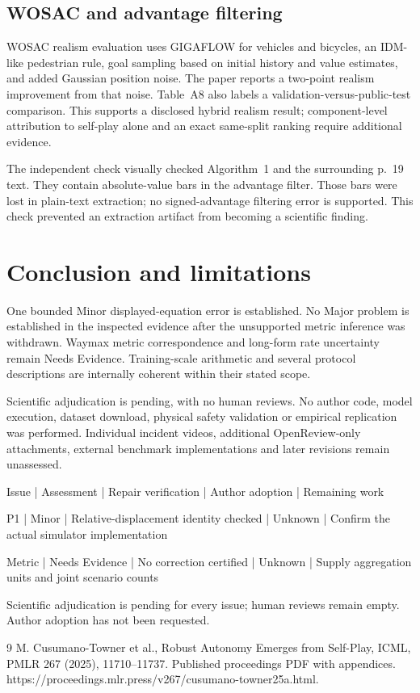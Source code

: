 \documentclass[10pt]{article}
\begin{document}
\subsection*{WOSAC and advantage filtering}
WOSAC realism evaluation uses GIGAFLOW for vehicles and bicycles, an IDM-like pedestrian rule, goal sampling based on initial history and value estimates, and added Gaussian position noise. The paper reports a two-point realism improvement from that noise. Table A8 also labels a validation-versus-public-test comparison. This supports a disclosed hybrid realism result; component-level attribution to self-play alone and an exact same-split ranking require additional evidence.\par
The independent check visually checked Algorithm 1 and the surrounding p. 19 text. They contain absolute-value bars in the advantage filter. Those bars were lost in plain-text extraction; no signed-advantage filtering error is supported. This check prevented an extraction artifact from becoming a scientific finding.\par
\section*{Conclusion and limitations}
One bounded Minor displayed-equation error is established. No Major problem is established in the inspected evidence after the unsupported metric inference was withdrawn. Waymax metric correspondence and long-form rate uncertainty remain Needs Evidence. Training-scale arithmetic and several protocol descriptions are internally coherent within their stated scope.\par
Scientific adjudication is pending, with no human reviews. No author code, model execution, dataset download, physical safety validation or empirical replication was performed. Individual incident videos, additional OpenReview-only attachments, external benchmark implementations and later revisions remain unassessed.\par
Issue | Assessment | Repair verification | Author adoption | Remaining work\par
P1 | Minor | Relative-displacement identity checked | Unknown | Confirm the actual simulator implementation\par
Metric | Needs Evidence | No correction certified | Unknown | Supply aggregation units and joint scenario counts\par
Scientific adjudication is pending for every issue; human reviews remain empty. Author adoption has not been requested.\par
9 M. Cusumano-Towner et al., Robust Autonomy Emerges from Self-Play, ICML, PMLR 267 (2025), 11710–11737. Published proceedings PDF with appendices. https://proceedings.mlr.press/v267/cusumano-towner25a.html.\par
\end{document}
